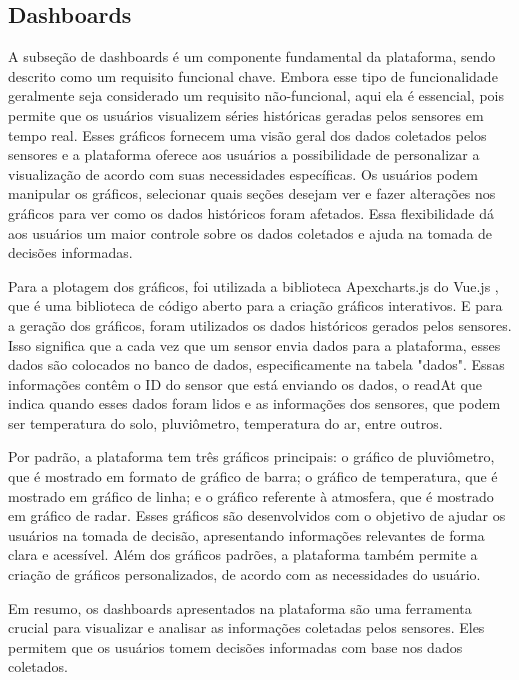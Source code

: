 \documentclass[tcc,capa]{texufpel}
\begin{document}
\subsection{Dashboards}
A subseção de dashboards é um componente fundamental da plataforma, sendo descrito como um requisito funcional chave. Embora esse tipo de funcionalidade geralmente seja considerado um requisito não-funcional, aqui ela é essencial, pois permite que os usuários visualizem séries históricas geradas pelos sensores em tempo real. Esses gráficos fornecem uma visão geral dos dados coletados pelos sensores e a plataforma oferece aos usuários a possibilidade de personalizar a visualização de acordo com suas necessidades específicas. Os usuários podem manipular os gráficos, selecionar quais seções desejam ver e fazer alterações nos gráficos para ver como os dados históricos foram afetados. Essa flexibilidade dá aos usuários um maior controle sobre os dados coletados e ajuda na tomada de decisões informadas.

Para a plotagem dos gráficos, foi utilizada a biblioteca Apexcharts.js \cite{ApexCharts:2022} do Vue.js \cite{vue:2014}, que é uma biblioteca de código aberto para a criação gráficos interativos. E para a geração dos gráficos, foram utilizados os dados históricos gerados pelos sensores. Isso significa que a cada vez que um sensor envia dados para a plataforma, esses dados são colocados no banco de dados, especificamente na tabela "dados". Essas informações contêm o ID do sensor que está enviando os dados, o readAt que indica quando esses dados foram lidos e as informações dos sensores, que podem ser temperatura do solo, pluviômetro, temperatura do ar, entre outros.

Por padrão, a plataforma tem três gráficos principais: o gráfico de pluviômetro, que é mostrado em formato de gráfico de barra; o gráfico de temperatura, que é mostrado em gráfico de linha; e o gráfico referente à atmosfera, que é mostrado em gráfico de radar. Esses gráficos são desenvolvidos com o objetivo de ajudar os usuários na tomada de decisão, apresentando informações relevantes de forma clara e acessível. Além dos gráficos padrões, a plataforma também permite a criação de gráficos personalizados, de acordo com as necessidades do usuário.

Em resumo, os dashboards apresentados na plataforma são uma ferramenta crucial para visualizar e analisar as informações coletadas pelos sensores. Eles permitem que os usuários tomem decisões informadas com base nos dados coletados.
\end{document}
